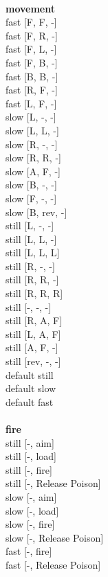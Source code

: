 \ \\ {\bf movement } \\
fast [F, F, -] \\
fast [F, R, -] \\
fast [F, L, -] \\
fast [F, B, -] \\
fast [B, B, -] \\
fast [R, F, -] \\
fast [L, F, -] \\
slow [L, -, -] \\
slow [L, L, -] \\
slow [R, -, -] \\
slow [R, R, -] \\
slow [A, F, -] \\
slow [B, -, -] \\
slow [F, -, -] \\
slow [B, rev, -] \\
still [L, -, -] \\
still [L, L, -] \\
still [L, L, L] \\
still [R, -, -] \\
still [R, R, -] \\
still [R, R, R] \\
still [-, -, -] \\
still [R, A, F] \\
still [L, A, F] \\
still [A, F, -] \\
still [rev, -, -] \\
default still \\
default slow \\
default fast \\
\ \\ {\bf fire } \\
still [-, aim] \\
still [-, load] \\
still [-, fire] \\
still [-, Release Poison] \\
slow [-, aim] \\
slow [-, load] \\
slow [-, fire] \\
slow [-, Release Poison] \\
fast [-, fire] \\
fast [-, Release Poison] \\


